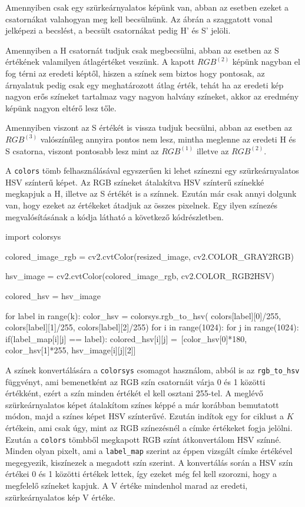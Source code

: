 Amennyiben csak egy szürkeárnyalatos képünk van, abban az esetben ezeket a csatornákat valahogyan meg kell becsülnünk. Az ábrán a szaggatott vonal jelképezi a becslést, a becsült csatornákat pedig H' és S' jelöli.

Amennyiben a H csatornát tudjuk csak megbecsülni, abban az esetben az S értékének valamilyen átlagértéket veszünk. A kapott $RGB^{(2)}$ képünk nagyban el fog térni az eredeti képtől, hiszen a színek sem biztos hogy pontosak, az árnyalatuk pedig csak egy meghatározott átlag érték, tehát ha az eredeti kép nagyon erős színeket tartalmaz vagy nagyon halvány színeket, akkor az eredmény képünk nagyon eltérő lesz tőle.

Amennyiben viszont az S értékét is vissza tudjuk becsülni, abban az esetben az $RGB^{(3)}$ valószínűleg annyira pontos nem lesz, mintha meglenne az eredeti H és S csatorna, viszont pontosabb lesz mint az $RGB^{(1)}$ illetve az $RGB^{(2)}$.

A \texttt{colors} tömb felhasználásával egyszerűen ki lehet színezni egy szürkeárnyalatos HSV színterű képet. Az RGB színeket átalakítva HSV színterű színekké megkapjuk a H, illetve az S értékét is a színnek. Ezután már csak annyi dolgunk van, hogy ezeket az értékeket átadjuk az összes pixelnek. Egy ilyen színezés megvalósításának a kódja látható a következő kódrészletben.
\begin{python}
import colorsys

colored_image_rgb = cv2.cvtColor(resized_image, cv2.COLOR_GRAY2RGB)

hsv_image = cv2.cvtColor(colored_image_rgb, cv2.COLOR_RGB2HSV)

colored_hsv = hsv_image

for label in range(k):
    color_hsv = colorsys.rgb_to_hsv(
        colors[label][0]/255,
        colors[label][1]/255,
        colors[label][2]/255)
    for i in range(1024):
        for j in range(1024):
            if(label_map[i][j] == label):
                colored_hsv[i][j] =\
                [color_hsv[0]*180, color_hsv[1]*255, hsv_image[i][j][2]]
\end{python}

A színek konvertálására a \texttt{colorsys} csomagot használom, abból is az \texttt{rgb\_to\_hsv} függvényt, ami bemenetként az RGB szín csatornáit várja 0 és 1 közötti értékként, ezért a szín minden értékét el kell osztani 255-tel. A meglévő szürkeárnyalatos képet átalakítom színes képpé a már korábban bemutatott módon, majd a színes képet HSV színterűvé. Ezután indítok egy for ciklust a $K$ értékein, ami csak úgy, mint az RGB színezésnél a címke értékeket fogja jelölni. Ezután a \texttt{colors} tömbből megkapott RGB színt átkonvertálom HSV színné. Minden olyan pixelt, ami a \texttt{label\_map} szerint az éppen vizsgált címke értékével megegyezik, kiszínezek a megadott szín szerint. A konvertálás során a HSV szín értékei 0 és 1 közötti értékek lettek, így ezeket még fel kell szorozni, hogy a megfelelő színeket kapjuk. A V értéke mindenhol marad az eredeti, szürkeárnyalatos kép V értéke.

